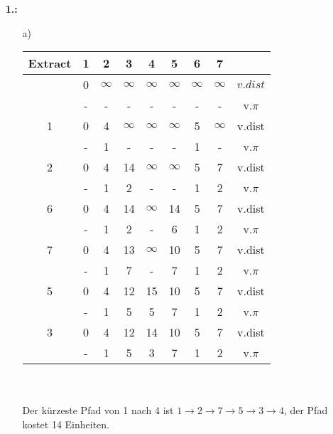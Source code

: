 \documentclass[a4paper,11pt,fleqn]{scrartcl}
\title{\titleinfo}
\author{\authorinfo}
\begin{document}
	\maketitle
	\begin{enumerate}
		\item[\textbf{1.:}]
		\begin{enumerate}
			\item[a)] \quad \\
			\begin{tabular}{c||c|c|c|c|c|c|c|c}
                Extract & 1 & 2 & 3 & 4 & 5 & 6 & 7 & \\ \hline\hline
                & 0 & $\infty$ & $\infty$ & $\infty$& $\infty$& $\infty$& $\infty$& $v.dist$ \\ \hline
                & - & - & - & - & - & - & - & v.$\pi$ \\ \hline
                1 & 0& 4& $\infty$& $\infty$& $\infty$& 5 & $\infty$ & v.dist \\ \hline
                & -& 1 & -& -& - & 1& - & v.$\pi$ \\ \hline
                2 & 0& 4& 14& $\infty$& $\infty$& 5 & 7 & v.dist \\ \hline
                & -& 1& 2& -& -& 1 & 2 & v.$\pi$ \\ \hline
                6 & 0& 4& 14& $\infty$& 14 & 5 & 7 & v.dist \\ \hline
                & -& 1& 2& -& 6 & 1 & 2 & v.$\pi$ \\ \hline
                7 & 0& 4& 13& $\infty$& 10 & 5 & 7 & v.dist \\ \hline
                & -& 1& 7& -& 7 & 1 & 2 & v.$\pi$ \\ \hline
                5 &0 &4 &12 & 15& 10 & 5 & 7 & v.dist \\ \hline
                & -& 1& 5& 5& 7 & 1 & 2 & v.$\pi$ \\ \hline
                3 &0 &4 &12 & 14& 10 & 5 & 7 & v.dist \\ \hline
                & -& 1& 5& 3& 7 & 1 & 2 & v.$\pi$ \\
			\end{tabular} \\ \\
			Der kürzeste Pfad von 1 nach 4 ist \(1 \to 2 \to 7 \to 5 \to 3 \to 4\), der Pfad kostet 14 Einheiten. \\ \\ \\
			\begin{tabular}{c||c|c|c|c|c|c|c|c}

\end{tabular}
\end{enumerate}
\end{enumerate}
\end{document}
